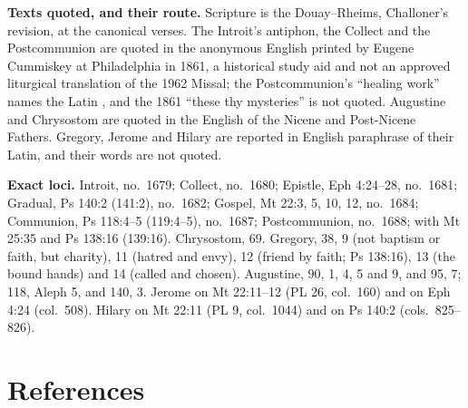 {\textbf{Texts quoted, and their route.} Scripture is the Douay--Rheims,
Challoner's revision, at the canonical verses. The Introit's antiphon, the
Collect and the Postcommunion are quoted in the anonymous English printed by
Eugene Cummiskey at Philadelphia in 1861, a historical study aid and not an
approved liturgical translation of the 1962 Missal; the Postcommunion's
``healing work'' names the Latin , and the 1861
``these thy mysteries'' is not quoted. Augustine and Chrysostom are quoted in
the English of the Nicene and Post-Nicene Fathers. Gregory, Jerome and Hilary
are reported in English paraphrase of their Latin, and their words are not
quoted.

\textbf{Exact loci.} Introit, no.~1679; Collect, no.~1680; Epistle,
Eph 4:24--28, no.~1681; Gradual, Ps 140:2 (141:2), no.~1682; Gospel, Mt 22:3,
5, 10, 12, no.~1684; Communion, Ps 118:4--5 (119:4--5), no.~1687;
Postcommunion, no.~1688; with Mt 25:35 and Ps 138:16 (139:16). Chrysostom,  69. Gregory,
 38, 9 (not baptism or faith, but charity), 11
(hatred and envy), 12 (friend by faith; Ps 138:16), 13 (the bound hands) and 14
(called and chosen). Augustine,  90, 1, 4, 5 and 9, and 
95, 7;  118, Aleph 5, and 140, 3. Jerome on
Mt 22:11--12 (PL 26, col.~160) and on Eph 4:24 (col.~508). Hilary on Mt 22:11
(PL 9, col.~1044) and on Ps 140:2 (cols.~825--826).

\par}

\section*{References}

